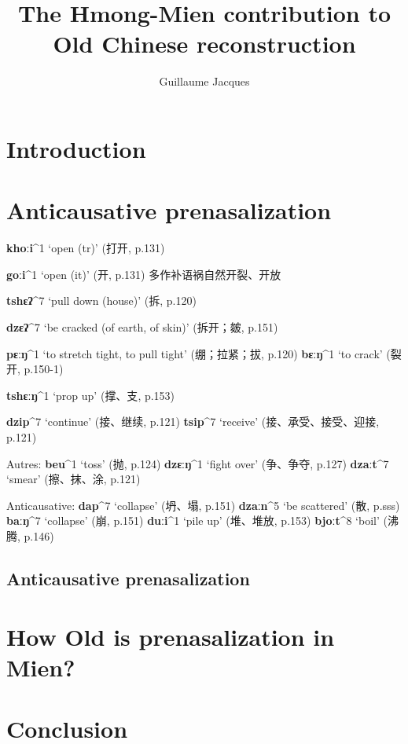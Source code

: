 \documentclass[oneside,a4paper,11pt]{article}
\newcommand{\ipa}[1]{\textbf{{\phon\mbox{#1}}}} %
\newcommand{\zh}[1]{{\cn #1}}
\newcommand{\mien}[5]{\ipa{#1}^{#2} `#3' (\zh{#4}, p.#5)}
\begin{document}
\title{The Hmong-Mien contribution to Old Chinese reconstruction}
\author{Guillaume Jacques}
\maketitle

\section*{Introduction}
\citet{sagart03prenasalized}
\citet{maozw92mien}
\citet{ratliff10protohm}
\citet{wang95protomy}
\section{Anticausative prenasalization}
\citet[14-16]{downer73loanwords}

\citet{wanglz12jieci}
 
\mien{khoːi}{1}{open (tr)}{打开}{131} 

\mien{goːi}{1}{open (it)}{开}{131}  
\zh{多作补语祸自然开裂、开放}

\mien{tshɛʔ}{7}{pull down (house)}{拆}{120}
 
\mien{dzɛʔ}{7}{be cracked (of earth, of skin)}{拆开；皴}{151}

\mien{pɛːŋ}{1}{to stretch tight, to pull tight}{绷；拉紧；拔}{120}
\mien{bɛːŋ}{1}{to crack}{裂开}{150-1}



\mien{tshɛːŋ}{1}{prop up}{撑、支}{153} 

\mien{dzip}{7}{continue}{接、继续}{121}
\mien{tsip}{7}{receive}{接、承受、接受、迎接}{121}


Autres:
\mien{beu}{1}{toss}{抛}{124} 
\mien{dzɛːŋ}{1}{fight over}{争、争夺}{127} 
\mien{dzaːt}{7}{smear}{擦、抹、涂}{121} 

Anticausative:
\mien{dap}{7}{collapse}{坍、塌}{151} 
\mien{dzaːn}{5}{be scattered}{散}{sss}
\mien{baːŋ}{7}{collapse}{崩}{151} 
\mien{duːi}{1}{pile up}{堆、堆放}{153} 
\mien{bjoːt}{8}{boil}{沸腾}{146} 

\subsection{Anticausative prenasalization}

\citet[193-4]{jacques15causative}
\citet[285-288]{jacques15spontaneous}
\citet{jacques15derivational.khaling}

\section{How Old is prenasalization in Mien?}

\section*{Conclusion}



\end{document}

